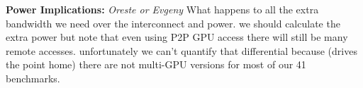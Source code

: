 \textbf{Power Implications:} \textit{Oreste or Evgeny}
What happens to all the extra bandwidth we need over the interconnect and
power.  we should calculate the extra power but note that even using P2P GPU
access there will still be many remote accesses.  unfortunately we can't quantify
that differential because (drives the point home) there are not multi-GPU versions
for most of our 41 benchmarks.